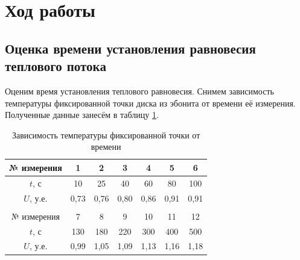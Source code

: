\documentclass[a4paper,12pt]{article} %
\begin{document}
\section{Ход работы}

\subsection{Оценка времени установления равновесия теплового потока}

Оценим время установления теплового равновесия. Снимем зависимость температуры фиксированной точки диска из эбонита от времени её измерения. Полученные данные занесём в таблицу \ref{tab:relaxation_time}.

\begin{table}[H]
	\centering
	\begin{tabular}{ccccccc}
		\hline
		\multicolumn{1}{|c|}{№ измерения} &
		\multicolumn{1}{c|}{1} &
		\multicolumn{1}{c|}{2} &
		\multicolumn{1}{c|}{3} &
		\multicolumn{1}{c|}{4} &
		\multicolumn{1}{c|}{5} &
		\multicolumn{1}{c|}{6} \\ \hline
		\multicolumn{1}{|c|}{$ t $, с} &
		\multicolumn{1}{c|}{10} &
		\multicolumn{1}{c|}{25} &
		\multicolumn{1}{c|}{40} &
		\multicolumn{1}{c|}{60} &
		\multicolumn{1}{c|}{80} &
		\multicolumn{1}{c|}{100} \\ \hline
		\multicolumn{1}{|c|}{$ U $, у.е.} &
		\multicolumn{1}{c|}{0,73} &
		\multicolumn{1}{c|}{0,76} &
		\multicolumn{1}{c|}{0,80} &
		\multicolumn{1}{c|}{0,86} &
		\multicolumn{1}{c|}{0,91} &
		\multicolumn{1}{c|}{0,91} \\ \hline
		&
		&
		&
		&
		&
		&
		\\ \hline
		\multicolumn{1}{|c|}{№ измерения} &
		\multicolumn{1}{c|}{7} &
		\multicolumn{1}{c|}{8} &
		\multicolumn{1}{c|}{9} &
		\multicolumn{1}{c|}{10} &
		\multicolumn{1}{c|}{11} &
		\multicolumn{1}{c|}{12} \\ \hline
		\multicolumn{1}{|c|}{$ t $, с} &
		\multicolumn{1}{c|}{130} &
		\multicolumn{1}{c|}{180} &
		\multicolumn{1}{c|}{220} &
		\multicolumn{1}{c|}{300} &
		\multicolumn{1}{c|}{400} &
		\multicolumn{1}{c|}{500} \\ \hline
		\multicolumn{1}{|c|}{$ U $, у.е.} &
		\multicolumn{1}{c|}{0,99} &
		\multicolumn{1}{c|}{1,05} &
		\multicolumn{1}{c|}{1,09} &
		\multicolumn{1}{c|}{1,13} &
		\multicolumn{1}{c|}{1,16} &
		\multicolumn{1}{c|}{1,18} \\ \hline
	\end{tabular}
	\caption{Зависимость температуры фиксированной точки от времени}
	\label{tab:relaxation_time}
\end{table}
\end{document}
